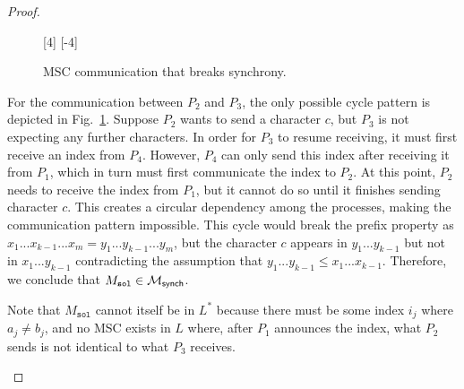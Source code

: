\begin{proof}
\begin{itemize}
\begin{figure}[!ht]
\begin{msc}[draw frame=none, draw head=none, msc keyword=, head height=0px, label distance=0.5ex, foot height=0px, foot distance=0px]{}
				      [4]%
				      \nextlevel
				      \nextlevel
				      [-4]
			      \end{msc}
			      \caption{MSC communication that breaks synchrony.} %
			      \label{fig:cycle2}
		      \end{figure}

		      For the communication between $P_2$ and $P_3$, the only possible cycle
		      pattern is depicted in Fig.~\ref{fig:cycle2}.
		      Suppose $P_2$ wants to send a character $c$, but $P_3$
		      is not expecting any further characters. In order for
		      $P_3$ to resume receiving, it must first receive an index
		      from $P_4$. However, $P_4$ can only send this index
		      after receiving it from $P_1$, which in turn must first
		      communicate the index to $P_2$.
		      At this point, $P_2$ needs to receive the index from
		      $P_1$, but it cannot do so until it finishes sending
		      character $c$. This creates a circular dependency among the
		      processes, making the communication pattern impossible. %
		      This cycle would break the prefix property as
		      $x_1...x_{k-1}...x_m= y_1...y_{k-1}...y_m$, but the character $c$ appears
		      in $y_1...y_{k-1}$ but not in $x_1...y_{k-1}$ contradicting the
		      assumption that $y_1...y_{k-1} \leq x_1...x_{k-1}$.
		      Therefore, we conclude that $M_{\texttt{sol}} \in \mathcal{M}_{\mathsf{synch}}$.

		      Note that $M_{\texttt{sol}}$ cannot itself be in $L^*$ because there must be
		      some index $i_j$ where $a_j \neq b_j$, and no MSC exists in $L$ where,
		      after $P_1$ announces the index, what $P_2$ sends is not
		      identical to what $P_3$ receives.


\end{itemize}
\end{proof}

